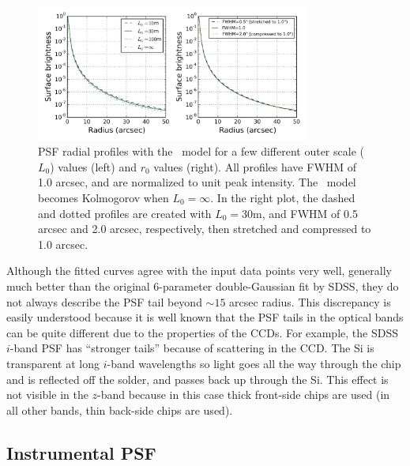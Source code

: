\begin{figure}[ht]
\centering
\includegraphics[width=0.8\textwidth]{FIGURES/vonK.png}
\vskip -0.2in 
\caption{PSF radial profiles with the \vk~model for a few different
  outer scale ($L_0$) values (left) and $r_0$ values (right). 
All profiles have FWHM of 1.0 arcsec, and
  are normalized to unit peak intensity. The \vk~model becomes
  Kolmogorov when $L_0 = \infty$.
In the right plot, the dashed and dotted profiles are created with
$L_0 = 30$m, and 
FWHM of 0.5 arcsec and 2.0 arcsec, respectively, then stretched and compressed to 1.0 arcsec.
\label{fig:vonK}}
\end{figure}




Although the fitted
curves agree with the input data points very well, generally much better than the
original 6-parameter double-Gaussian fit by SDSS, they do not always describe
the PSF tail beyond $\sim 15$ arcsec radius. This discrepancy is easily understood
because it is well known that the PSF tails in the optical bands can be quite
different due to the properties of the CCDs.
For example, the SDSS $i$-band PSF has ``stronger tails''
because of scattering in the CCD.  The Si is transparent at long $i$-band wavelengths 
so light goes all the way through the chip and is reflected off the solder, and passes 
back up through the Si. This effect is not visible in the $z$-band because in this case
thick front-side chips are used (in all other bands, thin back-side chips are used). 



\subsection{Instrumental PSF \label{sec:instrPSF}} 

